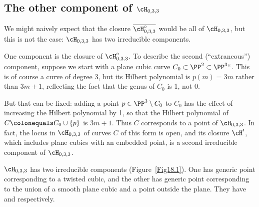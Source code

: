 \subsection*{The other component of
\texorpdfstring{$\cH_{0,3,3}$}{$H_{0,3,3}$}}

We might naively expect that the closure $\overline{\cH^\circ_{0,3,3}}$
would be all of $\cH_{0,3,3}$, but this is not the case:  $\cH_{0,3,3}$
has two irreducible components.

One component is the closure of $\cH^\circ_{0,3,3}$. To describe the
second (``extraneous'') component, suppose we start with a plane cubic
curve $C_0 \subset \PP^2 \subset \PP^3` `$. This is of course a curve of
degree 3, but its Hilbert polynomial is $p(m) = 3m$ rather than $3m+1$,
reflecting the fact that the genus of $C_0$ is 1, not 0.

But that can be fixed: adding a point $p \in \PP^3 \setminus C_0$
to $C_0$ has the effect of increasing the Hilbert polynomial by 1, so
that the Hilbert polynomial of $C \colonequals  C_0\cup \{p\}$ is $3m+1$. Thus
$C$  corresponds to a point of $\cH_{0,3,3}$. In fact, the locus
in $\cH_{0,3,3}$ of curves $C$ of this form is open, and its closure
$\cH'$, which includes plane cubics with an embedded point, is a second
irreducible component of $\cH_{0,3,3}$.


\begin{theorem}
$\cH_{0,3,3}$ has two irreducible components
{\normalfont(Figure~\ref{Fig18.1})}. One
has generic point corresponding to  a twisted cubic,
and the other has generic point corresponding to the union of a smooth
plane cubic and a point outside the plane.
They have
\1\2 and \1\5 respectively.
\end{theorem}

